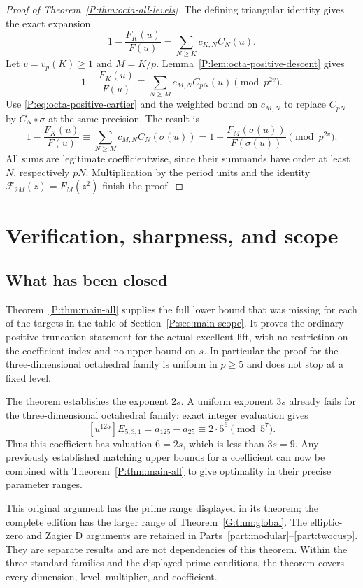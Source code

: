 \documentclass[11pt,a4paper]{article}
\theoremstyle{definition}\newtheorem{definition}[theorem]{Definition}
\theoremstyle{remark}\newtheorem{remark}[theorem]{Remark}
\numberwithin{equation}{section}
\begin{document}
\begin{proof}[Proof of Theorem~\ref{P:thm:octa-all-levels}]
The defining triangular identity gives the exact expansion
\[
 1-\frac{F_K(u)}{F(u)}
    =\sum_{N\geq K}c_{K,N}C_N(u).
\]
Let \(v=v_p(K)\geq1\) and \(M=K/p\).
Lemma~\ref{P:lem:octa-positive-descent} gives
\[
 1-\frac{F_K(u)}{F(u)}
 \equiv\sum_{N\geq M}c_{M,N}C_{pN}(u)
 \pmod{p^{2v}}.
\]
Use \eqref{P:eq:octa-positive-cartier} and the weighted bound
on \(c_{M,N}\) to replace \(C_{pN}\) by
\(C_N\circ\sigma\) at the same precision.  The result is
\[
 1-\frac{F_K(u)}{F(u)}
 \equiv\sum_{N\geq M}c_{M,N}C_N(\sigma(u))
 =1-\frac{F_M(\sigma(u))}{F(\sigma(u))}
 \pmod{p^{2v}}.
\]
All sums are legitimate coefficientwise, since their summands
have order at least \(N\), respectively \(pN\).
Multiplication by the period units and the identity
\(\mathcal F_{2M}(z)=F_M(z^2)\) finish the proof.
\end{proof}



\section{Verification, sharpness, and scope}\label{P:source-main-4}
\label{P:sec:verification}

\subsection{What has been closed}

Theorem~\ref{P:thm:main-all} supplies the full lower bound that was
missing for each of the targets in the table of
Section~\ref{P:sec:main-scope}. It proves the ordinary positive
truncation statement for the actual excellent lift, with no
restriction on the coefficient index and no upper bound on $s$.
In particular the proof for the three-dimensional octahedral
family is uniform in $p\ge5$ and does not stop at a fixed level.

The theorem establishes the exponent $2s$. A uniform exponent
$3s$ already fails for the three-dimensional octahedral family:
exact integer evaluation gives
\[
 [u^{125}]E_{5,3,1}=a_{125}-a_{25}
       \equiv2\cdot5^6\pmod{5^7}.
\]
Thus this coefficient has valuation $6=2s$, which is less than $3s=9$.
Any previously established matching upper bounds for a coefficient
can now be combined with Theorem~\ref{P:thm:main-all} to give
optimality in their precise parameter ranges.

This original argument has the prime range displayed in its theorem;
the complete edition has the larger range of Theorem~\ref{G:thm:global}.
The elliptic-zero and Zagier D arguments are retained in Parts~\ref{part:modular}--\ref{part:twocusp}. They are separate results and are not dependencies of this theorem. Within the three standard families and the displayed prime conditions, the theorem covers every dimension, level, multiplier, and coefficient.
\end{document}
